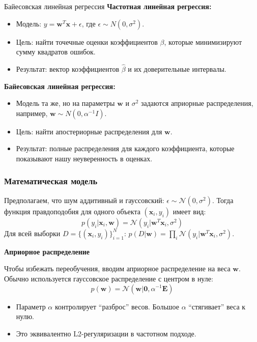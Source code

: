 \documentclass[notheorems, handout]{beamer}
\newcommand{\vect}[1]{\mathbf{#1}}
\newcommand{\matr}[1]{\boldsymbol{#1}}
\begin{document}
\begin{frame}{Байесовская линейная регрессия}
    \textbf{Частотная линейная регрессия:}
    \begin{itemize}
        \item Модель: $y = \vect{w}^T\vect{x} + \epsilon$, где $\epsilon \sim N(0, \sigma^2)$.
        \item Цель: найти точечные оценки коэффициентов $\beta$, которые минимизируют сумму квадратов ошибок.
        \item Результат: вектор коэффициентов $\hat{\beta}$ и их доверительные интервалы.
    \end{itemize}
    \vspace{0.5cm}
    \textbf{Байесовская линейная регрессия:}
    \begin{itemize}
        \item Модель та же, но на параметры $\vect{w}$ и $\sigma^2$ задаются априорные распределения, например, $\vect{w} \sim N(0, \alpha^{-1}I)$.
        \item Цель: найти апостериорные распределения для $\vect{w}$.
        \item Результат: полные распределения для каждого коэффициента, которые показывают нашу неуверенность в оценках.
    \end{itemize}
\end{frame}
\begin{frame}
  \frametitle{Математическая модель}
  Предполагаем, что шум аддитивный и гауссовский: $\epsilon \sim \mathcal{N}(0, \sigma^2)$.
  Тогда функция правдоподобия для одного объекта $(\vect{x}_i, y_i)$ имеет вид:
  $$ p(y_i|\vect{x}_i, \vect{w}) = \mathcal{N}(y_i | \vect{w}^T\vect{x}_i, \sigma^2) $$
  Для всей выборки $D = \{(\vect{x}_i, y_i)\}_{i=1}^N$: $p(D|\vect{w}) = \prod_i \mathcal{N}(y_i | \vect{w}^T\vect{x}_i, \sigma^2)$.
  
  \vspace{1em}
  \textbf{Априорное распределение}
  
  Чтобы избежать переобучения, вводим априорное распределение на веса $\vect{w}$. Обычно используется гауссовское распределение с центром в нуле:
  $$ p(\vect{w}) = \mathcal{N}(\vect{w} | \vect{0}, \alpha^{-1}\matr{E}) $$
  \begin{itemize}
    \item Параметр $\alpha$ контролирует ``разброс'' весов. Большое $\alpha$ ``стягивает'' веса к нулю.
    \item Это эквивалентно L2-регуляризации в частотном подходе.
  \end{itemize}
\end{frame}
\end{document}
